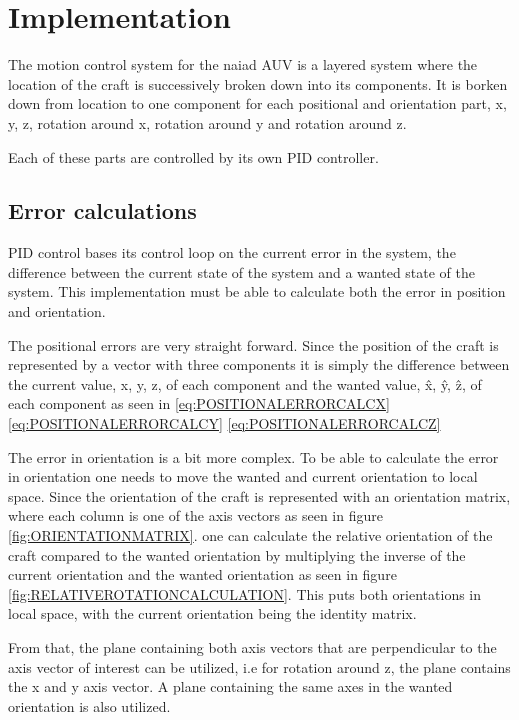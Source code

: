 \section{Implementation}\label{sec:implementation}

The motion control system for the naiad AUV is a layered system where the location of the craft is successively broken down into its components. It is borken down from location to one component for each positional and orientation part, x, y, z, rotation around x, rotation around y and rotation around z. 

Each of these parts are controlled by its own PID controller.

\subsection{Error calculations}
PID control bases its control loop on the current error in the system, the difference between the current state of the system and a wanted state of the system. This implementation must be able to calculate both the error in position and orientation.

The positional errors are very straight forward. Since the position of the craft is represented by a vector with three components it is simply the difference between the current value, x, y, z, of each component and the wanted value, \^x, \^y, \^z, of each component as seen in \eqref{eq:POSITIONALERRORCALCX} \eqref{eq:POSITIONALERRORCALCY} \eqref{eq:POSITIONALERRORCALCZ}

The error in orientation is a bit more complex. To be able to calculate the error in orientation one needs to move the wanted and current orientation to local space. Since the orientation of the craft is represented with an orientation matrix, where each column is one of the axis vectors as seen in figure \ref{fig:ORIENTATIONMATRIX}. one can calculate the relative orientation of the craft compared to the wanted orientation by multiplying the inverse of the current orientation and the wanted orientation as seen in figure \ref{fig:RELATIVEROTATIONCALCULATION}. This puts both orientations in local space, with the current orientation being the identity matrix.

From that, the plane containing both axis vectors that are perpendicular to the axis vector of interest can be utilized, i.e for rotation around z, the plane contains the x and y axis vector. A plane containing the same axes in the wanted orientation is also utilized.

